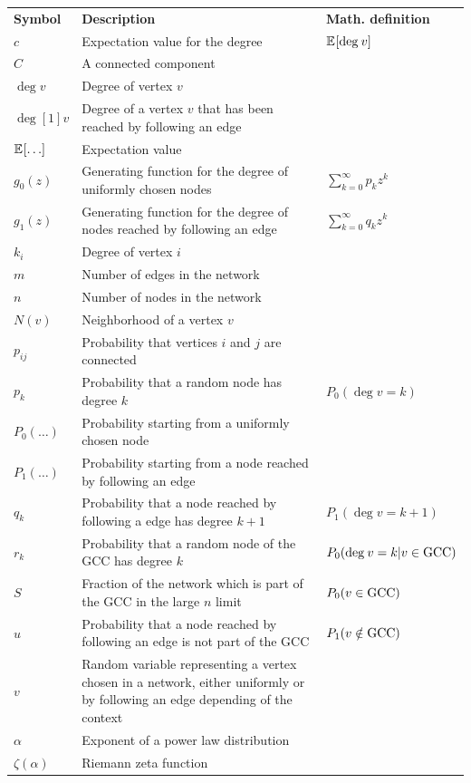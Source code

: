 \documentclass[
11pt, %
english, %
singlespacing, %
nolistspacing, %
liststotoc, %
headsepline, %
]{MastersDoctoralThesis} %
\begin{document}
\begin{longtable}{m{}m{}m{}}

\textbf{Symbol}	& \textbf{Description} & \textbf{Math. definition} \\
\addlinespace

$c$			& Expectation value for the degree & $\mathbb{E}_{}\!\left[ \mathrm{deg}_{}\, v \right]$ \\
$C$			& A connected component \\
$\deg{v}$	& Degree of vertex $v$ \\
$\deg[1]{v}$	& Degree of a vertex $v$ that has been reached by following an edge \\
$\expected{\dots}$	& Expectation value \\
$g_0(z)$	& Generating function for the degree of uniformly chosen nodes & $\sum_{k=0}^\infty p_k z^k$ \\
$g_1(z)$	& Generating function for the degree of nodes reached by following an edge & $\sum_{k=0}^\infty q_k z^k$ \\
$k_i$	& Degree of vertex $i$ \\
$m$		& Number of edges in the network \\
$n$			& Number of nodes in the network \\
$N(v)$ 		& Neighborhood of a vertex $v$ \\
$p_{ij}$	& Probability that vertices $i$ and $j$ are connected \\
$p_k$		& Probability that a random node has degree $k$ & $P_0(\deg{v} = k)$ \\
$P_0(\dots)$	& Probability starting from a uniformly chosen node \\
$P_1(\dots)$	& Probability starting from a node reached by following an edge \\
$q_k$		& Probability that a node reached by following a edge has degree $k + 1$ & $P_1(\deg{v} = k + 1)$ \\
$r_k$		& Probability that a random node of the GCC has degree $k$ & $P_0(\mathrm{deg}_{}\, v = k | v \in \mathrm{GCC})$ \\
$S$ 		& Fraction of the network which is part of the GCC in the large $n$ limit & $P_0(v \in \mathrm{GCC})$ \\
$u$			& Probability that a node reached by following an edge is not part of the GCC & $P_1(v \notin \mathrm{GCC})$ \\
$v$			& Random variable representing a vertex chosen in a network, either uniformly or by following an edge depending of the context \\

\addlinespace
\addlinespace
\addlinespace

$\alpha$	& Exponent of a power law distribution \\
$\zeta(\alpha)$	& Riemann zeta function \\

\end{longtable}
\end{document}
